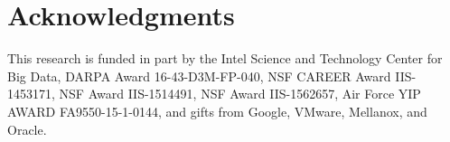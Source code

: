 \documentclass{sig-alternate-05-2015}
\begin{document}








\section{Acknowledgments}
This research is funded in part by the Intel Science and Technology Center for Big Data, DARPA Award 16-43-D3M-FP-040, NSF CAREER Award IIS-1453171, NSF Award IIS-1514491, NSF Award IIS-1562657, Air Force YIP AWARD FA9550-15-1-0144, and gifts from Google, VMware, Mellanox, and Oracle.

\balance



%
\end{document}

